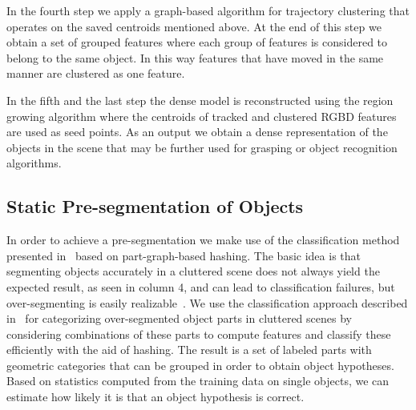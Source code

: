   
In the fourth step we apply a graph-based algorithm for trajectory clustering that operates on the saved centroids mentioned above. At the end of this step we obtain a set of grouped features where each group of features is considered to belong to the same object. In this way features that have moved in the same manner are clustered as one feature. 

 In the fifth and the last step the dense model is reconstructed using the region growing algorithm 
where the centroids of tracked and clustered RGBD features are
used as seed points. As an output we obtain a dense representation of the objects in the scene that may be further used for grasping or object recognition algorithms.


\subsection{Static Pre-segmentation of Objects}
\label{sec:static-seg}

In order to achieve a pre-segmentation we make use of the classification method presented 
in~\cite{marton12SC} based on part-graph-based hashing.
The basic idea is that segmenting objects accurately 
in a cluttered scene does not always yield the expected result, as seen in %
column 4, and can lead to classification failures, 
but over-segmenting is easily realizable~\cite{soupofsegments,Lai_Fox_2010,mozos11furniture}. 
We use the classification approach described in~\cite{marton12SC} 
for categorizing over-segmented object parts in cluttered scenes
by considering combinations of these parts to compute features
and classify these efficiently with the aid of hashing.
The result is a set of labeled parts with geometric categories
that can be grouped in order to obtain object hypotheses.
Based on statistics computed from the training data on single objects, 
we can estimate how likely it is that an object hypothesis is
correct.


